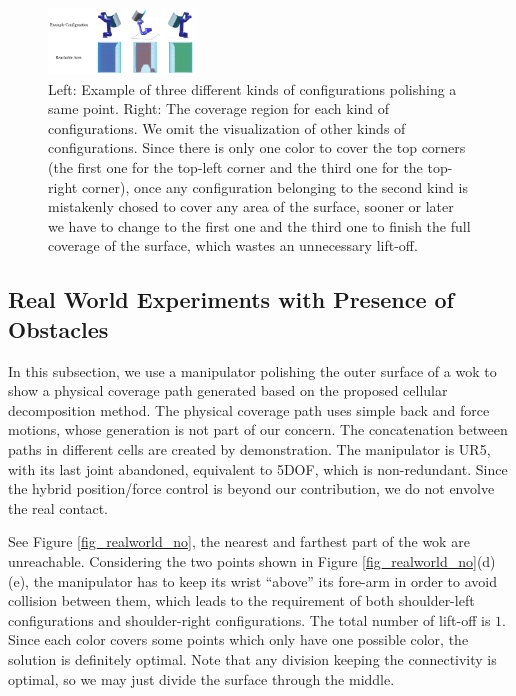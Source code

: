 \documentclass[journal]{IEEEtran}
\begin{document}
\begin{figure}[htb]
\centering
\includegraphics[width = 0.35\textwidth]{exp_pipe/three_example_pose}
\caption{Left: Example of three different kinds of configurations polishing a same point. Right: The coverage region for each kind of configurations. 
We omit the visualization of other kinds of configurations. Since  there is only one color to cover the top corners (the first one for the top-left corner and the third one for the top-right corner), once any configuration belonging to the second kind is mistakenly chosed to cover any area of the surface, sooner or later we have to change to the first one and the third one to finish the full coverage of the surface, which wastes an unnecessary lift-off.}\label{figthreeexamplepose}
\end{figure}

\subsection{Real World Experiments with Presence of Obstacles}

In this subsection, we use a manipulator polishing the outer surface of a wok to show a physical coverage path generated based on the proposed cellular decomposition method. 
The physical coverage path uses simple back and force motions, whose generation is not part of our concern. The concatenation between paths in different cells are created by demonstration. 
The manipulator is UR5, with its last joint abandoned, equivalent to 5DOF, which is non-redundant. 
Since the hybrid position/force control is beyond our contribution, we do not envolve the real contact. 

See Figure \ref{fig_realworld_no}, the nearest and farthest part of the wok are unreachable. 
Considering the two points shown in Figure \ref{fig_realworld_no}(d)(e), the manipulator has to keep its wrist ``above'' its fore-arm in order to avoid collision between them, which leads to the requirement of both shoulder-left configurations and shoulder-right configurations. 
The total number of lift-off is $1$. Since each color covers some points which only have one possible color, the solution is definitely optimal. Note that any division keeping the connectivity is optimal, so we may just divide the surface through the middle. 
\end{document}

